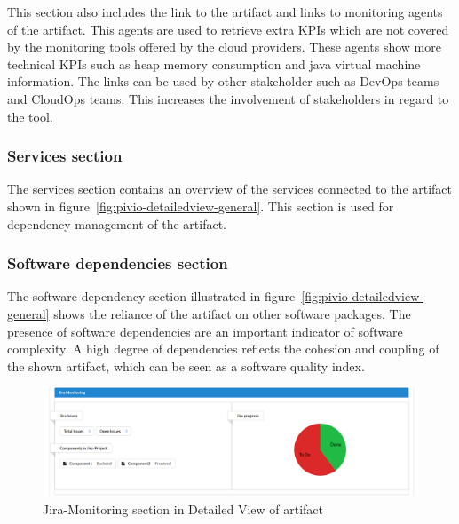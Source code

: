 This section also includes the link to the artifact and links to monitoring agents of the artifact. This agents are used to retrieve extra KPIs which are not covered by the monitoring tools offered by the cloud providers. 
These agents show more technical KPIs such as heap memory consumption and java virtual machine information.
The links can be used by other stakeholder such as DevOps teams and CloudOps teams. This increases the involvement of stakeholders in regard to the tool.

\subsubsection{Services section}\label{subsubsection:servicessection}

The services section contains an overview of the services connected to the artifact shown in figure~\ref{fig:pivio-detailedview-general}. This section is used for dependency management of the artifact.

\subsubsection{Software dependencies section}\label{subsubsection:softwaredependenciessection}

The software dependency section illustrated in figure~\ref{fig:pivio-detailedview-general} shows the reliance of the artifact on other software packages. The presence of software dependencies are an important indicator of software complexity. 
A high degree of dependencies reflects the cohesion and coupling of the shown artifact, which can be seen as a software quality index. \cite{Wang2013}


\begin{figure}[htpb]
  \centering
  \includegraphics[width=1.0\textwidth]{figures/pivio-detailview-jira.PNG} \caption{Jira-Monitoring section in Detailed View of artifact}
  \label{fig:pivio-detailedview-jira}
\end{figure}

